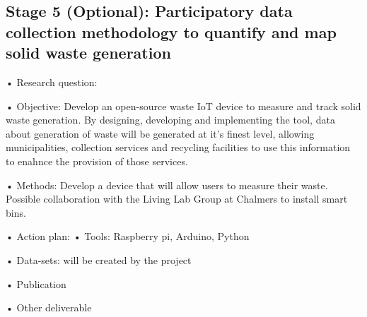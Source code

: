 \subsection{Stage 5 (Optional): Participatory data collection methodology to quantify and map solid waste generation}

•	Research question:            \par
•	Objective: Develop an open-source waste IoT device to measure and track solid waste generation. By designing, developing and implementing the tool, data about generation of waste will be generated at it's finest level, allowing municipalities, collection services and recycling facilities to use this information to enahnce the provision of those services.      \par
•	Methods: Develop a device that will allow users to measure their waste. Possible collaboration with the Living Lab Group at Chalmers to install smart bins.  \par
•	Action plan:
•	Tools: Raspberry pi, Arduino, Python \par
•	Data-sets: will be created by the project \par
•	Publication \par
•	Other deliverable \par


























